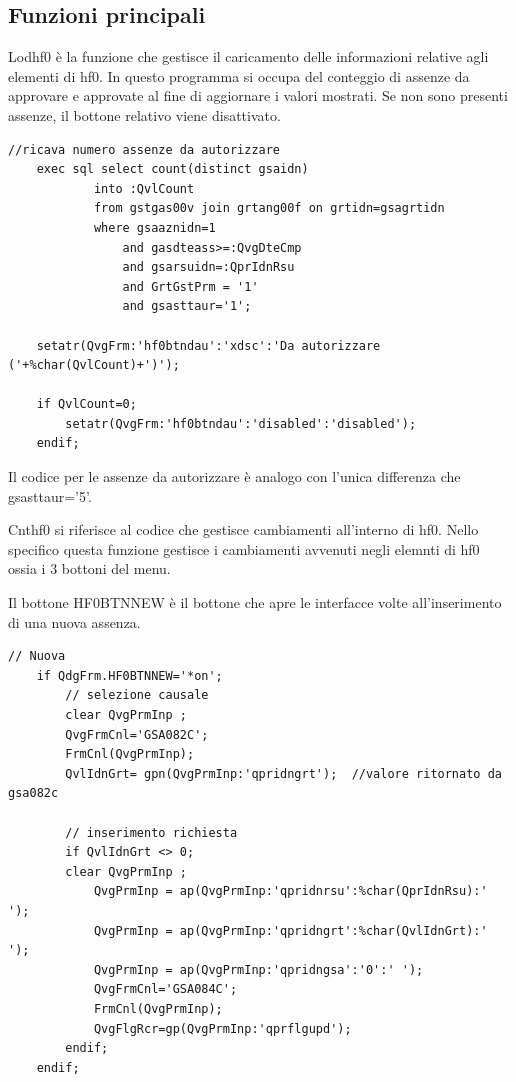 \documentclass[target=bach,aauheader=,style=]{thud}
\begin{document}
\subsection{Funzioni principali}
Lodhf0 è la funzione che gestisce il caricamento delle informazioni relative agli elementi di hf0.
In questo programma si occupa del conteggio di assenze da approvare e approvate al fine di aggiornare i valori mostrati. Se non sono presenti assenze, il bottone relativo viene disattivato.




\begin{lstlisting}[language=RPG, caption=Codice RPG di Lodhf0, label=lst:rpgHF0BTNNEW]
    //ricava numero assenze da autorizzare
    exec sql select count(distinct gsaidn)
            into :QvlCount
            from gstgas00v join grtang00f on grtidn=gsagrtidn
            where gsaaznidn=1
                and gasdteass>=:QvgDteCmp
                and gsarsuidn=:QprIdnRsu
                and GrtGstPrm = '1'
                and gsasttaur='1';

    setatr(QvgFrm:'hf0btndau':'xdsc':'Da autorizzare ('+%char(QvlCount)+')');

    if QvlCount=0;
        setatr(QvgFrm:'hf0btndau':'disabled':'disabled');
    endif;
\end{lstlisting}

Il codice per le assenze da autorizzare è analogo con l'unica differenza che gsasttaur='5'.


Cnthf0 si riferisce al codice che gestisce cambiamenti all'interno di hf0.
Nello specifico questa funzione gestisce i cambiamenti avvenuti negli elemnti di hf0 ossia i 3 bottoni del menu.

Il bottone HF0BTNNEW è il bottone che apre le interfacce volte all'inserimento di una nuova assenza.
\begin{lstlisting}[language=RPG, caption=Codice RPG del bottone HF0BTNNEW, label=lst:rpgHF0BTNNEW]
    // Nuova
    if QdgFrm.HF0BTNNEW='*on';
        // selezione causale
        clear QvgPrmInp ;
        QvgFrmCnl='GSA082C';
        FrmCnl(QvgPrmInp);
        QvlIdnGrt= gpn(QvgPrmInp:'qpridngrt');  //valore ritornato da gsa082c

        // inserimento richiesta
        if QvlIdnGrt <> 0;
        clear QvgPrmInp ;
            QvgPrmInp = ap(QvgPrmInp:'qpridnrsu':%char(QprIdnRsu):' ');
            QvgPrmInp = ap(QvgPrmInp:'qpridngrt':%char(QvlIdnGrt):' ');
            QvgPrmInp = ap(QvgPrmInp:'qpridngsa':'0':' ');
            QvgFrmCnl='GSA084C';
            FrmCnl(QvgPrmInp);
            QvgFlgRcr=gp(QvgPrmInp:'qprflgupd');
        endif;
    endif;
\end{lstlisting}
\end{document}
